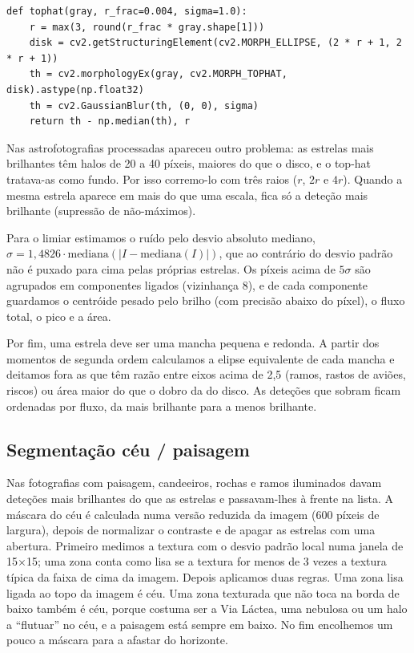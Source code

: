 \documentclass[11pt,a4paper]{article}
\begin{document}
\begin{lstlisting}[caption={Top-hat (\texttt{src/preprocessing.py}).},label=lst:tophat]
def tophat(gray, r_frac=0.004, sigma=1.0):
    r = max(3, round(r_frac * gray.shape[1]))
    disk = cv2.getStructuringElement(cv2.MORPH_ELLIPSE, (2 * r + 1, 2 * r + 1))
    th = cv2.morphologyEx(gray, cv2.MORPH_TOPHAT, disk).astype(np.float32)
    th = cv2.GaussianBlur(th, (0, 0), sigma)
    return th - np.median(th), r
\end{lstlisting}

Nas astrofotografias processadas apareceu outro problema: as estrelas mais
brilhantes têm halos de 20 a 40 píxeis, maiores do que o disco, e o top-hat
tratava-as como fundo. Por isso corremo-lo com três raios ($r$, $2r$ e $4r$).
Quando a mesma estrela aparece em mais do que uma escala, fica só a deteção
mais brilhante (supressão de não-máximos).

Para o limiar estimamos o ruído pelo desvio absoluto mediano,
$\sigma = 1{,}4826\cdot\mathrm{mediana}(|I - \mathrm{mediana}(I)|)$, que ao
contrário do desvio padrão não é puxado para cima pelas próprias estrelas.
Os píxeis acima de $5\sigma$ são agrupados em componentes ligados
(vizinhança 8), e de cada componente guardamos o centróide pesado pelo brilho
(com precisão abaixo do píxel), o fluxo total, o pico e a área.

Por fim, uma estrela deve ser uma mancha pequena e redonda. A partir dos
momentos de segunda ordem calculamos a elipse equivalente de cada mancha e
deitamos fora as que têm razão entre eixos acima de 2,5 (ramos, rastos de
aviões, riscos) ou área maior do que o dobro da do disco. As deteções que
sobram ficam ordenadas por fluxo, da mais brilhante para a menos brilhante.

\subsection{Segmentação céu / paisagem}

Nas fotografias com paisagem, candeeiros, rochas e ramos iluminados davam
deteções mais brilhantes do que as estrelas e passavam-lhes à frente na
lista. A máscara do céu é calculada numa versão reduzida da imagem (600
píxeis de largura), depois de normalizar o contraste e de apagar as estrelas
com uma abertura. Primeiro medimos a textura com o desvio padrão local numa
janela de 15$\times$15; uma zona conta como lisa se a textura for menos de 3
vezes a textura típica da faixa de cima da imagem. Depois aplicamos duas
regras. Uma zona lisa ligada ao topo da imagem é céu. Uma zona texturada que
não toca na borda de baixo também é céu, porque costuma ser a Via Láctea,
uma nebulosa ou um halo a ``flutuar'' no céu, e a paisagem está sempre em
baixo. No fim encolhemos um pouco a máscara para a afastar do horizonte.
\end{document}
